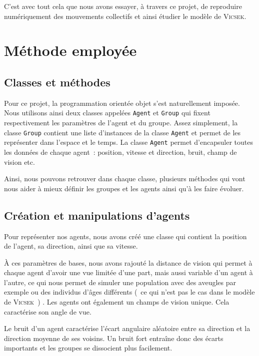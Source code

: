 \documentclass[french, a4paper, 12pt, openany]{report}
\begin{document}
	C'est avec tout cela que nous avons essayer, à travers ce projet, de reproduire numériquement des mouvements collectifs et ainsi étudier le modèle de \textsc{Vicsek}.\\
	
	
		
\chapter{Méthode employée}
\section{Classes et méthodes}

    Pour ce projet, la programmation orientée objet s'est naturellement imposée. Nous utilisons ainsi deux classes appelées \verb|Agent| et \verb|Group| qui fixent respectivement les paramètres de l'agent et du groupe. Assez simplement, la classe \verb|Group| contient une liste d'instances de la classe \verb|Agent| et permet de les représenter dans l'espace et le temps. La classe \verb|Agent| permet d'encapsuler toutes les données de chaque agent~: position, vitesse et direction, bruit, champ de vision etc.
    
	Ainsi, nous pouvons retrouver dans chaque classe, plusieurs méthodes qui vont nous aider à mieux définir les groupes et les agents ainsi qu'à les faire évoluer. \\
  
\section{Création et manipulations d'agents}
	Pour représenter nos agents, nous avons créé une classe qui contient la position de l'agent, sa direction, ainsi que sa vitesse.
	
	À ces paramètres de bases, nous avons rajouté la distance de vision qui permet à chaque agent d'avoir une vue limitée d'une part, mais aussi variable d'un agent à l'autre, ce qui nous permet de simuler une population avec des aveugles par exemple ou des individus d'âges différents (~ce qui n'est pas le cas dans le modèle de \textsc{Vicsek}~) . Les agents ont également un champs de vision unique. Cela caractérise son angle de vue.  
	
	Le bruit d'un agent caractérise l'écart angulaire aléatoire entre sa direction et la direction moyenne de ses voisins. Un bruit fort entraîne donc des écarts importants et les groupes se dissocient plus facilement.
	
\end{document}
